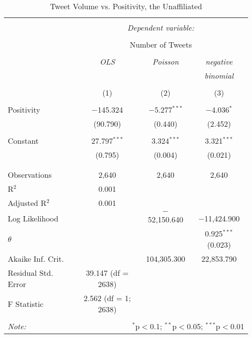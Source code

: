 \begin{table}[!htbp] \centering 
  \caption{Tweet Volume vs. Positivity, the Unaffiliated} 
  \label{} 
    \begin{tabular}{@{\extracolsep{5pt}}lccc} 
    \\[-1.8ex]\hline 
    \hline \\[-1.8ex] 
     & \multicolumn{3}{c}{\textit{Dependent variable:}} \\ 
    \cline{2-4} 
    \\[-1.8ex] & \multicolumn{3}{c}{Number of Tweets} \\ 
    \\[-1.8ex] & \textit{OLS} & \textit{Poisson} & \textit{negative} \\ 
     & \textit{} & \textit{} & \textit{binomial} \\ 
    \\[-1.8ex] & (1) & (2) & (3)\\ 
    \hline \\[-1.8ex] 
     Positivity & $-$145.324 & $-$5.277$^{***}$ & $-$4.036$^{*}$ \\ 
      & (90.790) & (0.440) & (2.452) \\ 
      & & & \\ 
     Constant & 27.797$^{***}$ & 3.324$^{***}$ & 3.321$^{***}$ \\ 
      & (0.795) & (0.004) & (0.021) \\ 
      & & & \\ 
    \hline \\[-1.8ex] 
    Observations & 2,640 & 2,640 & 2,640 \\ 
    R$^{2}$ & 0.001 &  &  \\ 
    Adjusted R$^{2}$ & 0.001 &  &  \\ 
    Log Likelihood &  & $-$52,150.640 & $-$11,424.900 \\ 
    $\theta$ &  &  & 0.925$^{***}$  (0.023) \\ 
    Akaike Inf. Crit. &  & 104,305.300 & 22,853.790 \\ 
    Residual Std. Error & 39.147 (df = 2638) &  &  \\ 
    F Statistic & 2.562 (df = 1; 2638) &  &  \\ 
    \hline 
    \hline \\[-1.8ex] 
    \textit{Note:}  & \multicolumn{3}{r}{$^{*}$p$<$0.1; $^{**}$p$<$0.05; $^{***}$p$<$0.01} \\ 
    \end{tabular} 
\end{table} 


